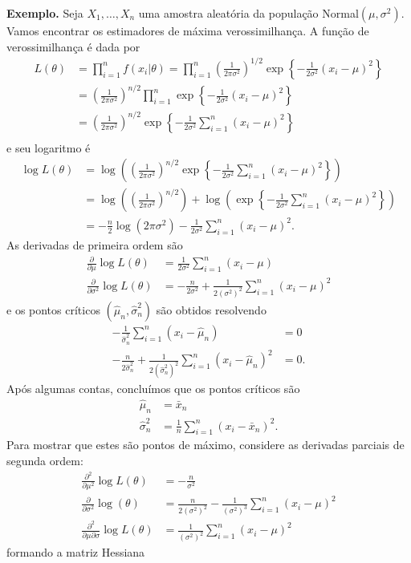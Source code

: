 \documentclass[
  letterpaper,
  DIV=11,
  numbers=noendperiod]{scrartcl}
\begin{document}
\textbf{Exemplo.} Seja \(X_1,\ldots,X_n\) uma amostra aleatória da
população Normal\((\mu,\sigma^2)\). Vamos encontrar os estimadores de
máxima verossimilhança. A função de verossimilhança é dada por
\[\begin{align*}
L(\theta)&=\prod_{i=1}^{n}f(x_i|\theta)=\prod_{i=1}^{n}\left(\frac{1}{2\pi\sigma^2}\right)^{1/2}\exp\left\{-\frac{1}{2\sigma^2}(x_i-\mu)^2\right\}\\
&= \left(\frac{1}{2\pi\sigma^2}\right)^{n/2}\prod_{i=1}^{n}\exp\left\{-\frac{1}{2\sigma^2}(x_i-\mu)^2\right\}\\
&= \left(\frac{1}{2\pi\sigma^2}\right)^{n/2}\exp\left\{-\frac{1}{2\sigma^2}\sum_{i=1}^{n}(x_i-\mu)^2\right\}\\
\end{align*}\] e seu logaritmo é \[\begin{align*}
\log L(\theta)&=\log\left(\left(\frac{1}{2\pi\sigma^2}\right)^{n/2}\exp\left\{-\frac{1}{2\sigma^2}\sum_{i=1}^{n}(x_i-\mu)^2\right\}\right)\\
&=\log\left(\left(\frac{1}{2\pi\sigma^2}\right)^{n/2}\right)+\log\left(\exp\left\{-\frac{1}{2\sigma^2}\sum_{i=1}^{n}(x_i-\mu)^2\right\}\right)\\
&=-\frac{n}{2}\log(2\pi\sigma^2)-\frac{1}{2\sigma^2}\sum_{i=1}^{n}(x_i-\mu)^2.
\end{align*}\] As derivadas de primeira ordem são \[\begin{align*}
\frac{\partial}{\partial\mu}\log L(\theta)&= \frac{1}{2\sigma^2}\sum_{i=1}^{n}(x_i-\mu) \\
\frac{\partial}{\partial\sigma^2}\log L(\theta)&= 
-\frac{n}{2\sigma^2} +\frac{1}{2\left(\sigma^2\right)^2}\sum_{i=1}^{n}(x_i-\mu)^2
\end{align*}\] e os pontos críticos \((\hat{\mu}_n,\hat{\sigma}^2_n)\)
são obtidos resolvendo \[\begin{align*}
-\frac{1}{\hat{\sigma}_n^2}\sum_{i=1}^{n}(x_i-\hat{\mu}_{n})&=0 \\
-\frac{n}{2\hat{\sigma}^2_n} +\frac{1}{2\left(\hat{\sigma}^2_n\right)^2}\sum_{i=1}^{n}(x_i-\hat{\mu}_n)^2&=0.
\end{align*}\] Após algumas contas, concluímos que os pontos críticos
são \[\begin{align*}
\hat{\mu}_n&=\bar{x}_n\\
\hat{\sigma}^2_n&=\frac{1}{n}\sum_{i=1}^{n}(x_i-\bar{x}_n)^2.
\end{align*}\] Para mostrar que estes são pontos de máximo, considere as
derivadas parciais de segunda ordem: \[\begin{align*}
\frac{\partial^2}{\partial\mu^2}\log L(\theta)&= -\frac{n}{\sigma^2} \\
\frac{\partial}{\partial\sigma^2}\log(\theta)&= 
\frac{n}{2(\sigma^2)^2} -\frac{1}{\left(\sigma^2\right)^3}\sum_{i=1}^{n}(x_i-\mu)^2\\
\frac{\partial^2}{\partial\mu\partial\sigma}\log L(\theta)&=\frac{1}{(\sigma^2)^2}\sum_{i=1}^{n}(x_i-\mu)^2
\end{align*}\] formando a matriz Hessiana
\end{document}
